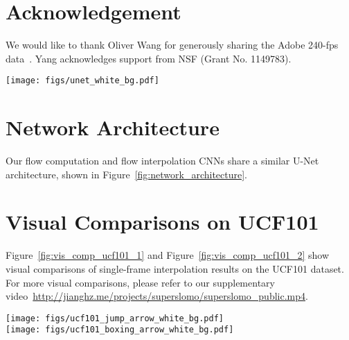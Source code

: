 \documentclass[10pt,twocolumn,letterpaper]{article}
\begin{document}


\section*{Acknowledgement}
We would like to thank Oliver Wang for generously sharing the Adobe 240-fps data~\cite{su16deep}.
Yang acknowledges support from NSF (Grant No. 1149783).

\begin{figure*}
\centering
\texttt{[image: figs/unet\_white\_bg.pdf]} \\
\caption{Illustration of the architecture of our flow computation and flow interpolation CNNs.}
\label{fig:network_architecture}
\end{figure*}

\appendix
\section{Network Architecture}
Our flow computation and flow interpolation CNNs share a similar U-Net architecture, shown in Figure~\ref{fig:network_architecture}.

\section{Visual Comparisons on UCF101}
Figure~\ref{fig:vis_comp_ucf101_1} and Figure~\ref{fig:vis_comp_ucf101_2} show visual comparisons of single-frame interpolation results on the UCF101 dataset. For more visual comparisons, please refer to our supplementary video~\url{http://jianghz.me/projects/superslomo/superslomo_public.mp4}.

{\small


}

\begin{figure*}
\centering
\texttt{[image: figs/ucf101\_jump\_arrow\_white\_bg.pdf]} \\
\texttt{[image: figs/ucf101\_boxing\_arrow\_white\_bg.pdf]}
\caption{Visual comparisons on the UCF101 dataset. (a) actual in-between frame, interpolation results from (b) PhaseBased~\cite{meyer15phase}, (c) FlowNet2~\cite{Baker2009OcclusionInterpolation,ilg16flownet2}, (d) SepConv~\cite{niklaus17video_iccv}, (e) DVF~\cite{liu17video}, and (f) Ours.}
\label{fig:vis_comp_ucf101_1}
\end{figure*}
\end{document}
